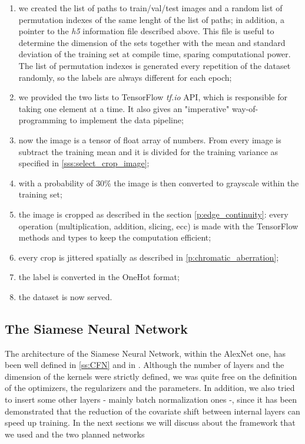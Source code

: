 \begin{enumerate}
    \item we created the list of paths to train/val/test images and a random list of permutation indexes of the same lenght of the list of paths; in addition, a pointer to the \emph{h5} information file described above. This file is useful to determine the dimension of the sets together with the mean and standard deviation of the training set at compile time, sparing computational power. The list of permutation indexes is generated every repetition of the dataset randomly, so the labels are always different for each epoch;
    \item we provided the two lists to TensorFlow \emph{tf.io} API, which is responsible for taking one element at a time. It also gives an "imperative" way-of-programming to implement the data pipeline;
    \item now the image is a tensor of float array of numbers. From every image is subtract the training mean and it is divided for the training variance as specified in \ref{sss:select_crop_image};
    \item with a probability of 30\% the image is then converted to grayscale within the training set;
    \item the image is cropped as described in the section \ref{p:edge_continuity}: every operation (multiplication, addition, slicing, ecc) is made with the TensorFlow methods and types to keep the computation efficient;
    \item every crop is jittered spatially as described in \ref{p:chromatic_aberration};
    \item the label is converted in the OneHot format;
    \item the dataset is now served.
\end{enumerate}

\subsection{The Siamese Neural Network}\label{ss:siamese}
The architecture of the Siamese Neural Network, within the AlexNet one, has been well defined in \ref{ss:CFN} and in \cite{alexnet_paper}. Although the number of layers and the dimension of the kernels were strictly defined, we was quite free on the definition of the optimizers, the regularizers and the parameters. In addition, we also tried to insert some other layers - mainly batch normalization ones -, since it has been demonstrated \cite{batch_norm_paper} that the reduction of the covariate shift between internal layers can speed up training. In the next sections we will discuss about the framework that we used and the two planned networks

